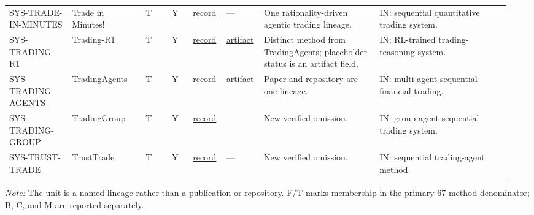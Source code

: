 \begin{longtable}{@{}L{0.12\linewidth}L{0.14\linewidth}L{0.05\linewidth}L{0.04\linewidth}L{0.06\linewidth}L{0.07\linewidth}L{0.22\linewidth}L{0.25\linewidth}@{}}
SYS-\allowbreak{}TRADE-\allowbreak{}IN-\allowbreak{}MINUTES & Trade in Minutes! & T & Y & \href{https://arxiv.org/abs/2510.04787}{record} & --- & One rationality-driven agentic trading lineage. & IN: sequential quantitative trading system. \\
SYS-\allowbreak{}TRADING-\allowbreak{}R1 & Trading-R1 & T & Y & \href{https://arxiv.org/abs/2509.11420}{record} & \href{https://github.com/TauricResearch/Trading-R1}{artifact} & Distinct method from TradingAgents; placeholder status is an artifact field. & IN: RL-trained trading-reasoning system. \\
SYS-\allowbreak{}TRADING-\allowbreak{}AGENTS & TradingAgents & T & Y & \href{https://arxiv.org/abs/2412.20138}{record} & \href{https://github.com/TauricResearch/TradingAgents}{artifact} & Paper and repository are one lineage. & IN: multi-agent sequential financial trading. \\
SYS-\allowbreak{}TRADING-\allowbreak{}GROUP & TradingGroup & T & Y & \href{https://arxiv.org/abs/2508.17565}{record} & --- & New verified omission. & IN: group-agent sequential trading system. \\
SYS-\allowbreak{}TRUST-\allowbreak{}TRADE & TrustTrade & T & Y & \href{https://arxiv.org/abs/2603.22567}{record} & --- & New verified omission. & IN: sequential trading-agent method. \\
\end{longtable}
\par\footnotesize\color{Ink}\emph{Note:} The unit is a named lineage rather than a publication or repository. F/T marks membership in the primary 67-method denominator; B, C, and M are reported separately.
\endgroup
